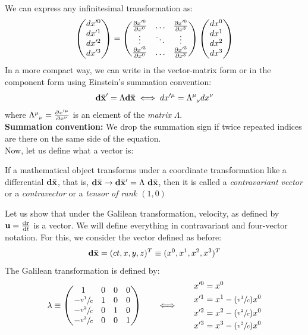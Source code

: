 We can express any infinitesimal transformation as:
$$ \begin{pmatrix}
    dx'^0\\
    dx'^1\\
    dx'^2\\
    dx'^3
\end{pmatrix} = \begin{pmatrix}
    \pdv{x'^0}{x^0} & \ldots &   \pdv{x'^0}{x^3}\\
    \vdots & \ddots & \vdots \\
    \pdv{x'^3}{x^0} & \ldots &\pdv{x'^3}{x^3}
\end{pmatrix}\begin{pmatrix}
    dx^0\\
    dx^1\\
    dx^2\\
    dx^3
\end{pmatrix}$$
In a more compact way, we can write in the vector-matrix form or in the component form using Einstein's summation convention: $$\vb{d\bar{x}}' = \Lambda \vb{d\bar{x}} \iff dx'^\mu = \tensor{\Lambda}{^\mu _\nu}dx^\nu$$
where $\tensor{\Lambda}{^\mu _\nu} = \pdv{x'^\mu}{x^\nu}$ is an element of the \textit{matrix} $\Lambda$.\\[0.2cm]
\textbf{Summation convention:} We drop the summation sign if twice repeated indices are there on the same side of the equation.\\[0.2cm]
Now, let us define what a vector is:
\begin{definition}[Vector]
    If a mathematical object transforms under a coordinate transformation like a differential $\vb{d\bar{x}}$, that is, $\vb{d\bar{x}} \rightarrow \vb{d\bar{x}'} = \Lambda \ \vb{d\bar{x}}$, then it is called a \textit{contravariant vector } or a \textit{contravector} or a \textit{tensor of rank $(1,0)$}
\end{definition}
Let us show that under the Galilean transformation, velocity, as defined by $\vb{u} = \dv{\vb{r}}{t}$ is a vector. We will define everything in contravariant and four-vector notation. For this, we consider the vector defined as before: $$\vb{d \bar{x}} = (ct,x,y,z)^T\equiv (x^0, x^1,x^2,x^3)^T$$ The Galilean transformation is defined by:
\[
\lambda \equiv
\begin{pmatrix}
1 & 0 & 0 & 0 \\
-\sfrac{v^1}{c} & 1 & 0 & 0 \\
-\sfrac{v^2}{c} & 0 & 1 & 0 \\
-\sfrac{v^3}{c} & 0 & 0 & 1
\end{pmatrix}
\qquad\Longleftrightarrow\qquad
\begin{aligned}
   x'^0 &= x^0 \\
   x'^1 &= x^1 - (\sfrac{v^1}{c})x^0 \\
   x'^2 &= x^2 - (\sfrac{v^2}{c})x^0 \\
   x'^3 &= x^3 - (\sfrac{v^3}{c})x^0
\end{aligned}
\]
